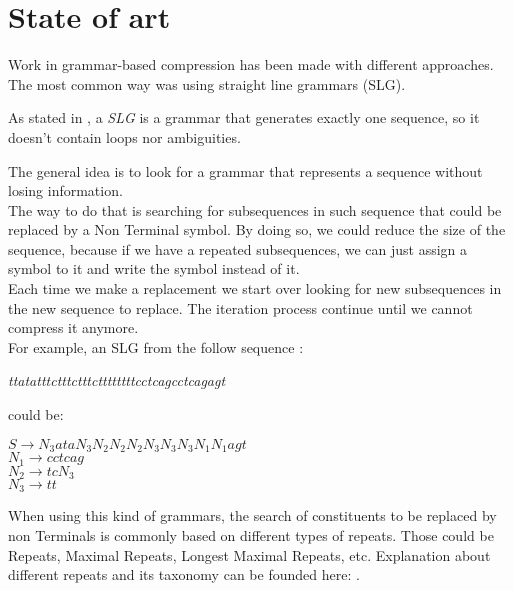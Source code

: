 \chapter{State of art}

	Work in grammar-based compression has been made with different approaches.
	The most common way was using straight line grammars (SLG). 

	As stated in \cite{Benz}, a \emph{SLG} is a grammar that generates exactly one sequence, 
	so it doesn't	contain loops nor ambiguities.

	The general idea is to look for a grammar that represents a sequence without losing 
	information. \\

	The way to do that is searching for subsequences in such sequence that
	could be replaced by a Non Terminal symbol. By doing so, we could reduce the size
	of the sequence, because if we have a repeated subsequences, we can just assign
	a symbol to it and write the symbol instead of it. \\

	Each time we make a replacement we start over looking for new subsequences in the new sequence to 
	replace. The iteration process continue until we cannot compress it anymore.\\

	For example, an SLG from the follow sequence \cite{Benz}:

	\begin{center}
		\emph{ttatatttctttctttcttttttttcctcagcctcagagt}
	\end{center}

	could be: \\


	\begin{center}
	$S \rightarrow N_3ataN_3N_2N_2N_2N_3N_3N_3N_1N_1agt$\\
	$N_1 \rightarrow cctcag$ \\
	$N_2 \rightarrow tcN_3$ \\
	$N_3 \rightarrow tt$
	\end{center}



	When using this kind of grammars, the search of constituents to be replaced by non Terminals
	is commonly based on different types of repeats. Those could be Repeats, Maximal Repeats, Longest Maximal 
	Repeats, etc.
	Explanation about different repeats and its taxonomy can be founded here: \cite[p.42-46]{GThesis}.\\

